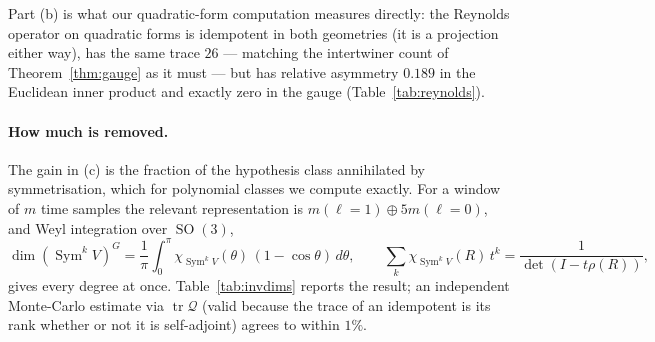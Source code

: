 \documentclass[11pt]{article}
\theoremstyle{definition}
\DeclareMathOperator{\SO}{SO}
\DeclareMathOperator{\Sym}{Sym}
\DeclareMathOperator{\tr}{tr}
\newcommand{\rhoext}{\rho}
\begin{document}
Part (b) is what our quadratic-form computation measures directly: the Reynolds
operator on quadratic forms is idempotent in both geometries (it is a projection
either way), has the same trace $26$ --- matching the intertwiner count of
Theorem~\ref{thm:gauge} as it must --- but has relative asymmetry $0.189$ in the
Euclidean inner product and exactly zero in the gauge (Table~\ref{tab:reynolds}).

\begin{table}[t]\centering
\caption{The Reynolds operator on quadratic forms. It remains a projection in both
geometries, but is self-adjoint only in the gauge of Theorem~\ref{thm:gauge}. This is
the precise step at which the orthogonal-action generalisation arguments fail.}
\label{tab:reynolds}

\end{table}

\begin{table}[t]\centering
\caption{The constant in Theorem~\ref{thm:gen}(c): condition number of the congruence
induced on degree-$k$ polynomial features by the change of gauge. It is modest at low
degree and grows geometrically, which is itself worth stating.}
\label{tab:distortion}

\end{table}

\paragraph{How much is removed.} The gain in (c) is the fraction of the hypothesis
class annihilated by symmetrisation, which for polynomial classes we compute exactly.
For a window of $m$ time samples the relevant representation is $m(\ell{=}1) \oplus
5m(\ell{=}0)$, and Weyl integration over $\SO(3)$,
\[
  \dim(\Sym^k V)^{G} = \frac{1}{\pi}\int_0^{\pi}
  \chi_{\Sym^k V}(\theta)\,(1-\cos\theta)\,d\theta,
  \qquad
  \sum_k \chi_{\Sym^k V}(R)\,t^k = \frac{1}{\det(I - t\rhoext(R))},
\]
gives every degree at once. Table~\ref{tab:invdims} reports the result; an independent
Monte-Carlo estimate via $\tr\mathcal{Q}$ (valid because the trace of an idempotent is
its rank whether or not it is self-adjoint) agrees to within $1\%$.

\begin{table}[t]\centering
\caption{Exact dimension of the invariant sub-class of degree-$k$ polynomial features
on $m$ time samples of a 12-lead ECG. The symmetry removes more than half the class
already at degree two.}
\label{tab:invdims}

\end{table}
\end{document}
